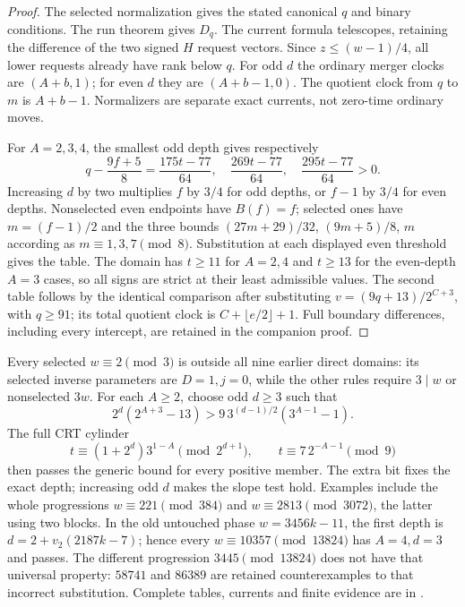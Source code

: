 \documentclass[11pt]{article}
\begin{document}
\begin{proof}
The selected normalization gives the stated canonical $q$ and binary
conditions. The run theorem gives $D_q$. The current formula telescopes,
retaining the difference of the two signed $H$ request vectors. Since
$z\le(w-1)/4$, all lower requests already have rank below $q$.
For odd $d$ the ordinary merger clocks are $(A+b,1)$; for even $d$ they
are $(A+b-1,0)$. The quotient clock from $q$ to $m$ is $A+b-1$.
Normalizers are separate exact currents, not zero-time ordinary moves.

For $A=2,3,4$, the smallest odd depth gives respectively
\[
 q-\frac{9f+5}{8}
 =\frac{175t-77}{64},\quad\frac{269t-77}{64},\quad
 \frac{295t-77}{64}>0.
\]
Increasing $d$ by two multiplies $f$ by $3/4$ for odd depths, or $f-1$
by $3/4$ for even depths. Nonselected even endpoints have $B(f)=f$;
selected ones have $m=(f-1)/2$ and the three bounds
$(27m+29)/32$, $(9m+5)/8$, $m$ according as $m\equiv1,3,7\pmod8$.
Substitution at each displayed even threshold gives the table. The
domain has $t\ge11$ for $A=2,4$ and $t\ge13$ for the even-depth
$A=3$ cases, so all signs are strict at their least admissible values.
The second table follows by the identical comparison after substituting
$v=(9q+13)/2^{C+3}$, with $q\ge91$; its total quotient clock is
$C+\lfloor e/2\rfloor+1$. Full boundary differences, including every
intercept, are retained in the companion proof.
\end{proof}

Every selected $w\equiv2\pmod3$ is outside all nine earlier direct
domains: its selected inverse parameters are $D=1,j=0$, while the other
rules require $3\mid w$ or nonselected $3w$. For each $A\ge2$, choose
odd $d\ge3$ such that
\[
 2^d(2^{A+3}-13)>9\,3^{(d-1)/2}(3^{A-1}-1).
\]
The full CRT cylinder
\[
 t\equiv(1+2^d)3^{1-A}\pmod{2^{d+1}},\qquad
 t\equiv7\,2^{-A-1}\pmod9
\]
then passes the generic bound for every positive member. The extra bit
fixes the exact depth; increasing odd $d$ makes the slope test hold.
Examples include the whole progressions $w\equiv221\pmod{384}$ and
$w\equiv2813\pmod{3072}$, the latter using two blocks. In the old
untouched phase $w=3456k-11$, the first depth is
$d=2+v_2(2187k-7)$; hence every $w\equiv10357\pmod{13824}$ has
$A=4,d=3$ and passes. The different progression $3445\pmod{13824}$
does not have that universal property: $58741$ and $86389$ are retained
counterexamples to that incorrect substitution.
Complete tables, currents and finite evidence are in
.
\end{document}
